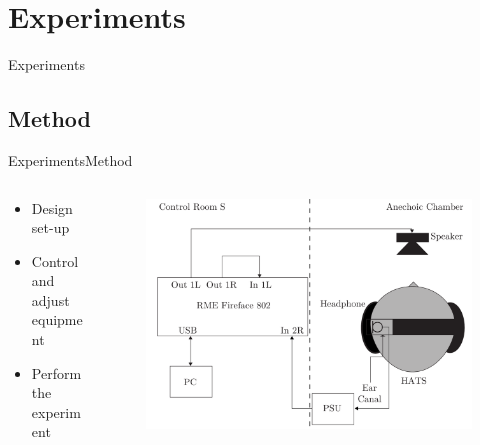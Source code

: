 \section{Experiments}
\begin{frame}{Experiments}
\end{frame}

\subsection{Method}
\begin{frame}{Experiments}{Method}		
	\begin{columns}
		\begin{column}{0.5\textwidth}
			\begin{itemize}
				\item Design set-up
				\item Control and adjust equipment
				\item Perform the experiment
			\end{itemize}	
		\end{column}
		\begin{column}{0.5\textwidth} 
			\begin{figure}
				\includegraphics[width=1\textwidth]{figures/SetupDiagram.pdf}
			\end{figure}
		\end{column}
	\end{columns}
\end{frame}


